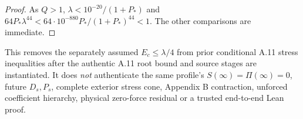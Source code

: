 \begin{proof}
As $Q>1$, $\lambda<10^{-20}/(1+P_*)$ and
$64P_*\lambda^{44}
<64\cdot10^{-880}P_* /(1+P_*)^{44}<1$.
The other comparisons are immediate.
\end{proof}
This removes the separately assumed $E_c\le\lambda/4$
from prior conditional A.11 stress inequalities after
the authentic A.11 root bound and source stages are
instantiated. It does \emph{not} authenticate the same
profile's $S(\infty)=\Pi(\infty)=0$, future $D_s,P_s$,
complete exterior stress cone, Appendix B contraction,
unforced coefficient hierarchy, physical zero-force
residual or a trusted end-to-end Lean proof.
